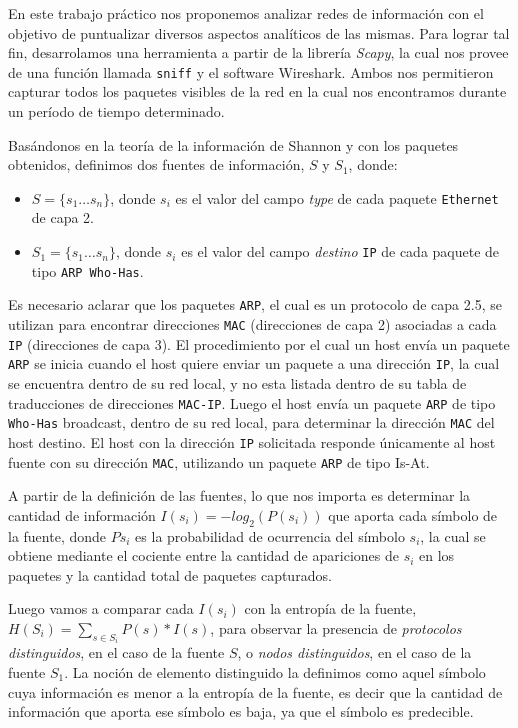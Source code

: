 En este trabajo práctico nos proponemos analizar redes de información con el objetivo de puntualizar diversos aspectos analíticos de las mismas. Para lograr tal fin, desarrolamos una herramienta a partir de la librería \textit{Scapy}, la cual nos provee de una función llamada \texttt{sniff} y el software Wireshark. Ambos nos permitieron capturar todos los paquetes visibles de la red en la cual nos encontramos durante un período de tiempo determinado.

Basándonos en la teoría de la información de Shannon y con los paquetes obtenidos, definimos dos fuentes de información, $S$ y $S_{1}$, donde:

\begin{itemize}
  \item $S = \{s_{1} \dots s_{n}\}$, donde $s_{i}$ es el valor del campo \emph{type} de cada paquete \texttt{Ethernet} de capa 2.
  \item $S_{1} = \{s_{1} \dots s_{n}\} $, donde $s_i$ es el valor del campo \emph{destino} \texttt{IP} de cada paquete de
  tipo \texttt{ARP Who-Has}.
\end{itemize}

Es necesario aclarar que los paquetes \texttt{ARP}, el cual es un protocolo de capa 2.5, se utilizan para encontrar direcciones \texttt{MAC} (direcciones de capa 2) asociadas a cada \texttt{IP} (direcciones de capa 3). El procedimiento por el cual un host envía un paquete \texttt{ARP} se inicia cuando el host quiere enviar un paquete a una dirección \texttt{IP}, la cual se encuentra dentro de su red local, y no esta listada dentro de su tabla de traducciones de direcciones \texttt{MAC-IP}. Luego el host envía un paquete \texttt{ARP} de tipo \texttt{Who-Has} broadcast, dentro de su red local, para determinar la dirección \texttt{MAC} del host destino. El host con la dirección \texttt{IP} solicitada responde únicamente al host fuente con su dirección \texttt{MAC}, utilizando un paquete \texttt{ARP} de tipo Is-At.

A partir de la definición de las fuentes, lo que nos importa es determinar la cantidad de información $I(s_{i}) = -log_2(P(s_{i}))$ que aporta cada símbolo de la fuente, donde $Ps_{i}$ es la probabilidad de ocurrencia del símbolo $s_{i}$, la cual se obtiene mediante el cociente entre la cantidad de apariciones de $s_{i}$ en los paquetes y la cantidad total de paquetes capturados.

Luego vamos a comparar cada $I(s_{i})$ con la entropía de la fuente, $H(S_{i}) = \sum\limits_{s \in S_{i}} P(s) * I(s)$, para observar la presencia de \emph{protocolos distinguidos}, en el caso de la fuente $S$, o \emph{nodos distinguidos}, en el caso de la fuente $S_{1}$. La noción de elemento distinguido la definimos como aquel símbolo cuya información es menor a la entropía de la fuente, es decir que la cantidad de información que aporta ese símbolo es baja, ya que el símbolo es predecible. 

